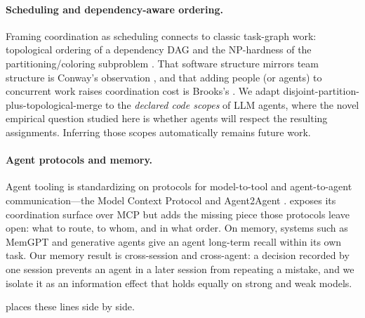 \paragraph{Scheduling and dependency-aware ordering.} Framing coordination as scheduling connects
to classic task-graph work: topological ordering of a dependency DAG \citep{kahn1962topological}
and the NP-hardness of the partitioning/coloring subproblem \citep{garey1979computers}. That
software structure mirrors team structure is Conway's observation \citep{conway1968committees}, and
that adding people (or agents) to concurrent work raises coordination cost is Brooks's
\citep{brooks1975mythical}. We adapt disjoint-partition-plus-topological-merge to the
\emph{declared code scopes} of LLM agents, where the novel empirical question studied here is
whether agents will respect the resulting assignments. Inferring those scopes automatically remains
future work.

\paragraph{Agent protocols and memory.} Agent tooling is standardizing on protocols for
model-to-tool and agent-to-agent communication---the Model Context Protocol
\citep{anthropic2024mcp} and Agent2Agent \citep{google2025a2a}. \sysname exposes its coordination
surface over MCP but adds the missing piece those protocols leave open: what to route, to whom, and
in what order. On memory, systems such as MemGPT \citep{packer2023memgpt} and generative agents
\citep{park2023generative} give an agent long-term recall within its own task. Our memory result is
cross-session and cross-agent: a decision recorded by one session prevents an agent in a later
session from repeating a mistake, and we isolate it as an information effect that holds
equally on strong and weak models.

 places these lines side by side.

\begin{table}[t]
\centering\small
\caption{Where NP-Bench and the planner sit relative to adjacent work.}
\label{tab:related}
\end{table}

